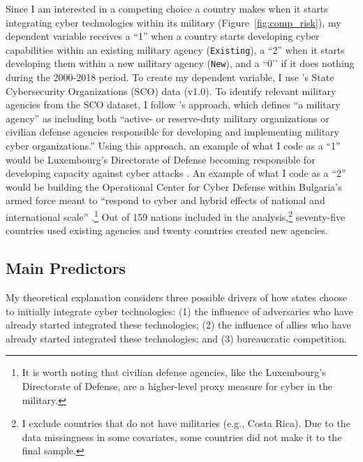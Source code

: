 \documentclass[12pt, letterpaper]{article}
\renewcommand{\baselinestretch}{1.35}
\let\oldfootnote\footnote
\renewcommand\footnote[1]{\oldfootnote{%
		\renewcommand\baselinestretch{.8}%
		\large\footnotesize\ignorespaces#1}} \addtolength{\footnotesep}{3pt}
\theoremstyle{plain}
\theoremstyle{remark}
\begin{document}
\noindent
Since I am interested in a competing choice a country makes when it starts integrating cyber technologies within its military (Figure~\ref{fig:comp_risk}), my dependent variable receives a ``1'' when a country starts developing cyber capabilities within an existing military agency (\texttt{Existing}), a ``2'' when it starts developing them within a new military agency (\texttt{New}), and a ``0’’ if it does nothing during the 2000-2018 period. To create my dependent variable, I use \citet{Kostyuk2022MoD}'s State Cybersecurity Organizations (SCO) data (v1.0). To identify relevant military agencies from the SCO dataset, I follow \citet{Kostyuk2024JPR}'s approach, which defines ``a military agency'' as including both ``active- or reserve-duty military organizations or civilian defense agencies responsible for developing and implementing military cyber organizations.'' Using this approach, an example of what I code as a ``1'' would be Luxembourg's Directorate of Defense becoming responsible for developing capacity against cyber attacks \citep[12]{Luxembourg2017Defense}.  An example of what I code as a ``2'' would be building the Operational Center for Cyber Defense within Bulgaria's armed force meant to ``respond to cyber and hybrid effects of national and international scale'' \citep[42-43]{Bulgaria2016NCSS}.\footnote{
    It is worth noting that civilian defense agencies, like the Luxembourg's Directorate of Defense, are a higher-level proxy measure for cyber in the military. 
    } 
Out of 159 nations included in the analysis,\footnote{
	I exclude countries that do not have militaries (e.g., Costa Rica). Due to the data missingness in some covariates, some countries did not make it to the final sample.
	}  
 seventy-five countries used existing agencies and twenty countries created new agencies.


\subsection*{Main Predictors}
\noindent
My theoretical explanation considers three possible drivers of how states choose to initially integrate cyber technologies: (1) the influence of adversaries who have already started integrated these technologies; (2) the influence of allies who have already started integrated these technologies; and (3) bureaucratic competition.
\vspace{3mm}
\end{document}
